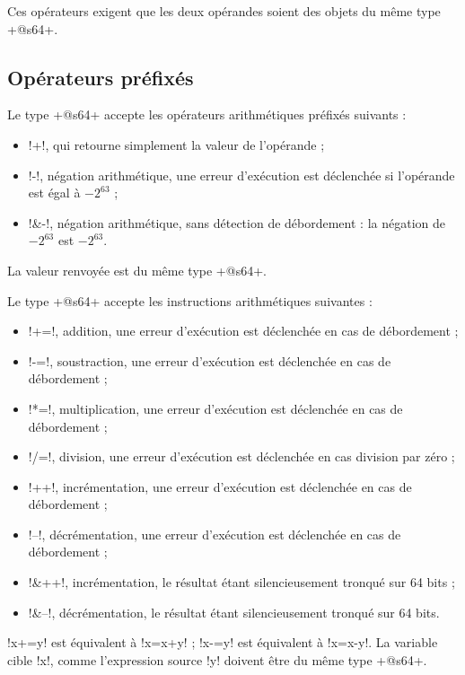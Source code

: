 Ces opérateurs exigent que les deux opérandes soient des objets du même type \ggsq+@s64+.

\subsection{Opérateurs préfixés}
Le type \ggsq+@s64+ accepte les opérateurs arithmétiques préfixés suivants :
\begin{itemize}
  \item \ggsq!+!, qui retourne simplement la valeur de l'opérande ;
  \item \ggsq!-!, négation arithmétique, une erreur d'exécution est déclenchée si l'opérande est égal à $-2^{63}$ ;
  \item \ggsq!&-!, négation arithmétique, sans détection de débordement : la négation de $-2^{63}$ est $-2^{63}$.
\end{itemize}

La valeur renvoyée est du même type  \ggsq+@s64+.



Le type \ggsq+@s64+ accepte les instructions arithmétiques suivantes :
\begin{itemize}
  \item \ggsq!+=!, addition, une erreur d'exécution est déclenchée en cas de débordement ;
  \item \ggsq!-=!, soustraction, une erreur d'exécution est déclenchée en cas de débordement ;
  \item \ggsq!*=!, multiplication, une erreur d'exécution est déclenchée en cas de débordement ;
  \item \ggsq!/=!, division, une erreur d'exécution est déclenchée en cas division par zéro ;
  \item \ggsq!++!, incrémentation, une erreur d'exécution est déclenchée en cas de débordement ;
  \item \ggsq!--!, décrémentation, une erreur d'exécution est déclenchée en cas de débordement ;
  \item \ggsq!&++!, incrémentation, le résultat étant silencieusement tronqué sur 64 bits ;
  \item \ggsq!&--!, décrémentation, le résultat étant silencieusement tronqué sur 64 bits.
\end{itemize}

\ggsq!x+=y! est équivalent à \ggsq!x=x+y! ; \ggsq!x-=y! est équivalent à \ggsq!x=x-y!.
La variable cible \ggsq!x!, comme l'expression source \ggsq!y! doivent être du même type \ggsq+@s64+.


